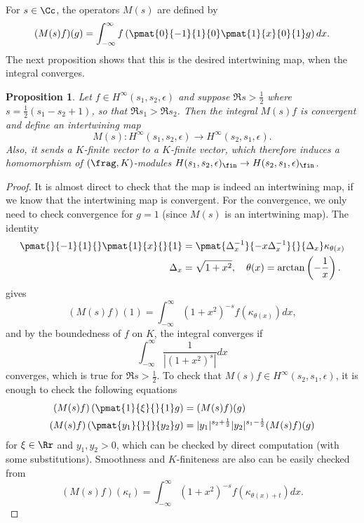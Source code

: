 \documentclass{article}
\newtheorem{proposition}{Proposition}[section]
\begin{document}
For $s\in \Cc$, the operators $M(s)$ are defined by 
$$
(M(s)f)(g) = \int_{-\infty}^{\infty} f\left(\pmat{0}{-1}{1}{0}\pmat{1}{x}{0}{1}g\right)dx.
$$
The next proposition shows that this is the desired intertwining map, when the integral converges. 
\begin{proposition}
Let $f\in H^{\infty}(s_{1}, s_{2}, \epsilon)$ and suppose $\Re s >\frac{1}{2}$ where $s = \frac{1}{2}(s_{1} - s_{2} + 1)$, so that $\Re s_{1} > \Re s_{2}$. Then the integral $M(s)f$ is convergent and define an intertwining map 
$$
M(s):H^{\infty}(s_{1}, s_{2}, \epsilon) \to H^{\infty}(s_{2}, s_{1}, \epsilon).
$$
Also, it sends a $K$-finite vector to a $K$-finite vector, which therefore induces a homomorphism of $(\frag, K)$-modules $H(s_{1}, s_{2}, \epsilon)_{\fin} \to H(s_{2}, s_{1}, \epsilon)_{\fin}$. 
\end{proposition}
\begin{proof}
It is almost direct to check that the map is indeed an intertwining map, if we know that the intertwining map is convergent. 
For the convergence, we only need to check convergence for $g = 1$ (since $M(s)$ is an intertwining map). The identity  
\begin{align*}
\pmat{}{-1}{1}{}\pmat{1}{x}{}{1} &= \pmat{\Delta_{x}^{-1}}{-x\Delta_{x}^{-1}}{}{\Delta_{x}} \kappa_{\theta(x)} \\
\Delta_{x} &= \sqrt{1+x^{2}}, \quad \theta(x) = \arctan\left(-\frac{1}{x}\right). 
\end{align*}
gives
$$
(M(s)f)(1) = \int_{-\infty}^{\infty} (1+x^{2})^{-s}f(\kappa_{\theta(x)})dx, 
$$
and by the boundedness of $f$ on $K$, the integral converges if 
$$
\int_{-\infty}^{\infty} \frac{1}{|(1+x^{2})^{s}|} dx
$$
converges, which is true for $\Re s>\frac{1}{2}$. 
To check that $M(s)f\in H^{\infty}(s_{2}, s_{1}, \epsilon)$, it is enough to check the following equations
\begin{align*}
(M(s)f)\left(\pmat{1}{\xi}{}{1}g\right) &= (M(s)f)(g) \\
(M(s)f)\left(\pmat{y_{1}}{}{}{y_{2}}g\right) &= |y_{1}|^{s_{2} + \frac{1}{2}} |y_{2}|^{s_{1} - \frac{1}{2}} (M(s)f)(g)
\end{align*}
for $\xi\in \Rr$ and $y_{1}, y_{2}>0$, which can be checked by direct computation (with some substitutions). 
Smoothness and $K$-finiteness are also can be easily checked from
$$
(M(s)f)(\kappa_{t}) = \int_{-\infty}^{\infty} (1+x^{2})^{-s}f(\kappa_{\theta(x)+t})dx.
$$
\end{proof}
\end{document}
